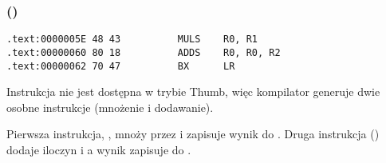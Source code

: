 \subsubsection{\OptimizingKeilVI (\ThumbMode)}

\begin{lstlisting}[label=ARM_leaf_example2,style=customasmARM]
.text:0000005E 48 43          MULS    R0, R1
.text:00000060 80 18          ADDS    R0, R0, R2
.text:00000062 70 47          BX      LR
\end{lstlisting}

Instrukcja  nie jest dostępna w trybie Thumb,
więc kompilator generuje dwie osobne instrukcje (mnożenie i dodawanie).


Pierwsza instrukcja, , mnoży  przez  i zapisuje wynik do .
Druga instrukcja () dodaje iloczyn i  a wynik zapisuje do .

